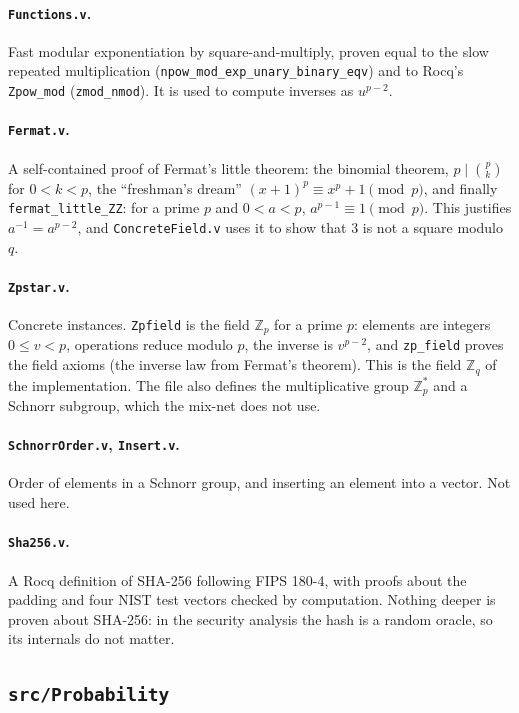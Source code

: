 \documentclass[11pt,a4paper]{article}
\newcommand{\Zq}{\mathbb{Z}_q}
\theoremstyle{definition}
\theoremstyle{plain}
\begin{document}
\paragraph{\texttt{Functions.v}.} Fast modular exponentiation by square-and-multiply, proven equal to
the slow repeated multiplication (\texttt{npow\_mod\_exp\_unary\_binary\_eqv}) and to Rocq's
\texttt{Zpow\_mod} (\texttt{zmod\_nmod}). It is used to compute inverses as $u^{p-2}$.

\paragraph{\texttt{Fermat.v}.} A self-contained proof of Fermat's little theorem: the binomial
theorem, $p\mid\binom pk$ for $0<k<p$, the ``freshman's dream'' $(x+1)^p\equiv x^p+1\pmod p$, and
finally \texttt{fermat\_little\_ZZ}: for a prime $p$ and $0<a<p$, $a^{p-1}\equiv1\pmod p$. This
justifies $a^{-1}=a^{p-2}$, and \texttt{ConcreteField.v} uses it to show that $3$ is not a square
modulo $q$.

\paragraph{\texttt{Zpstar.v}.} Concrete instances. \texttt{Zpfield} is the field
$\mathbb{Z}_p$ for a prime $p$: elements are integers $0\le v<p$, operations reduce modulo $p$, the
inverse is $v^{p-2}$, and \texttt{zp\_field} proves the field axioms (the inverse law from Fermat's
theorem). This is the field $\Zq$ of the implementation. The file also defines the multiplicative
group $\mathbb{Z}_p^*$ and a Schnorr subgroup, which the mix-net does not use.

\paragraph{\texttt{SchnorrOrder.v}, \texttt{Insert.v}.} Order of elements in a Schnorr group, and
inserting an element into a vector. Not used here.

\paragraph{\texttt{Sha256.v}.} A Rocq definition of SHA-256 following FIPS 180-4, with proofs about
the padding and four NIST test vectors checked by computation. Nothing deeper is proven about
SHA-256: in the security analysis the hash is a random oracle, so its internals do not matter.

\subsection{\texttt{src/Probability}}
\end{document}
